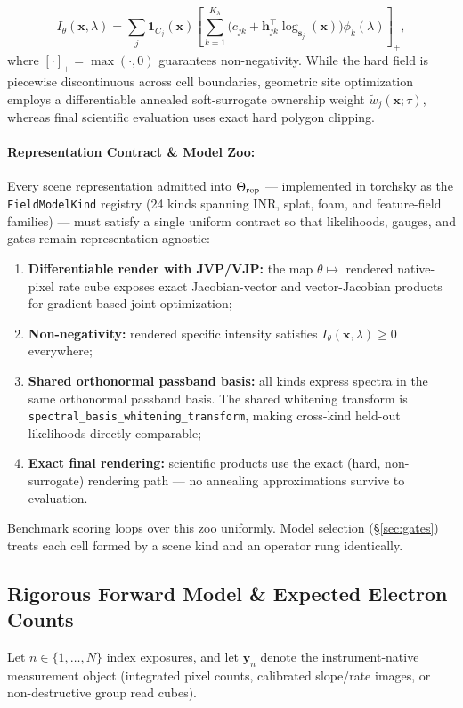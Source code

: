 \documentclass[11pt,a4paper]{article}
\begin{document}
\begin{enumerate}
    \begin{equation}
    I_\theta(\boldsymbol{x}, \lambda) = \sum_j \mathbf{1}_{C_j}(\boldsymbol{x}) \left[ \sum_{k=1}^{K_\lambda} \Big( c_{jk} + \boldsymbol{h}_{jk}^\top \log_{\boldsymbol{s}_j}(\boldsymbol{x}) \Big) \phi_k(\lambda) \right]_+,
    \end{equation}
    where $[\cdot]_+ = \max(\cdot, 0)$ guarantees non-negativity. While the hard field is piecewise discontinuous across cell boundaries, geometric site optimization employs a differentiable annealed soft-surrogate ownership weight $\widetilde{w}_j(\boldsymbol{x}; \tau)$, whereas final scientific evaluation uses exact hard polygon clipping.
\end{enumerate}


\paragraph{Representation Contract \& Model Zoo:}
Every scene representation admitted into $\Theta_{\rm rep}$ --- implemented in torchsky as the \texttt{FieldModelKind} registry (24 kinds spanning INR, splat, foam, and feature-field families) --- must satisfy a single uniform contract so that likelihoods, gauges, and gates remain representation-agnostic:
\begin{enumerate}
    \item \textbf{Differentiable render with JVP/VJP:} the map $\theta \mapsto$ rendered native-pixel rate cube exposes exact Jacobian-vector and vector-Jacobian products for gradient-based joint optimization;
    \item \textbf{Non-negativity:} rendered specific intensity satisfies $I_\theta(\boldsymbol{x},\lambda) \ge 0$ everywhere;
    \item \textbf{Shared orthonormal passband basis:} all kinds express spectra
    in the same orthonormal passband basis.  The shared whitening transform is
    \nolinkurl{spectral_basis_whitening_transform}, making cross-kind held-out
    likelihoods directly comparable;
    \item \textbf{Exact final rendering:} scientific products use the exact (hard, non-surrogate) rendering path --- no annealing approximations survive to evaluation.
\end{enumerate}
Benchmark scoring loops over this zoo uniformly.  Model selection
(\S\ref{sec:gates}) treats each cell formed by a scene kind and an operator
rung identically.

\subsection{Rigorous Forward Model \& Expected Electron Counts}
Let $n \in \{1, \dots, N\}$ index exposures, and let $\boldsymbol{y}_n$ denote the instrument-native measurement object (integrated pixel counts, calibrated slope/rate images, or non-destructive group read cubes).
\end{document}
